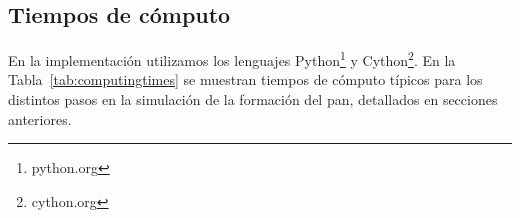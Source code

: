 




\subsection{Tiempos de cómputo}
En la implementación utilizamos los lenguajes Python\footnote{python.org} y Cython\footnote{cython.org}.
En la Tabla~\ref{tab:computingtimes} se muestran tiempos de cómputo típicos para los distintos pasos en la simulación de la formación del pan, detallados en secciones anteriores. %

